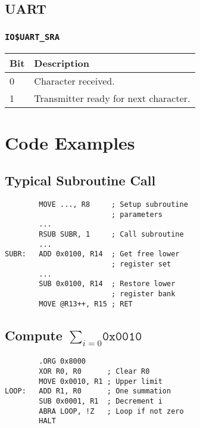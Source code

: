 \documentclass{leaflet}
\begin{document}
  \subsection{UART}
   \subsubsection{\texttt{IO\$UART\_SRA}}
    \begin{center}
     \begin{longtable}{|l|l|}
      \hline
       Bit&Description\\
      \hline
       0&Character received.\\
       1&Transmitter ready for next character.\\
      \hline
     \end{longtable}
    \end{center}
%
 \section{Code Examples}
  \subsection{Typical Subroutine Call}
   \begin{verbatim}
        MOVE ..., R8     ; Setup subroutine 
                         ; parameters
        ...
        RSUB SUBR, 1     ; Call subroutine
        ...
SUBR:   ADD 0x0100, R14  ; Get free lower
                         ; register set
        ...
        SUB 0x0100, R14  ; Restore lower
                         ; register bank
        MOVE @R13++, R15 ; RET
   \end{verbatim}
  \subsection{Compute $\sum_{i=0}{\texttt{0x0010}}$}
   \begin{verbatim}
        .ORG 0x8000
        XOR R0, R0      ; Clear R0
        MOVE 0x0010, R1 ; Upper limit
LOOP:   ADD R1, R0      ; One summation
        SUB 0x0001, R1  ; Decrement i
        ABRA LOOP, !Z   ; Loop if not zero
        HALT
   \end{verbatim}
\end{document}
